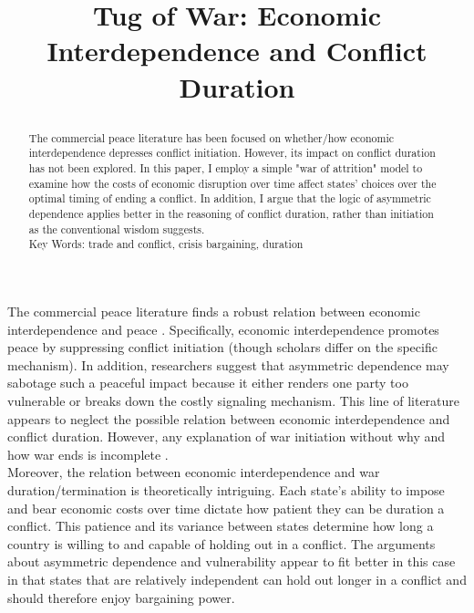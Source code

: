 \documentclass[12pt]{article} %
\title{    
 	\normalfont \normalsize 
 	\LARGE \textbf{Tug of War: Economic Interdependence and Conflict Duration}\\ %
 	\author{}
 }
\date{}
\begin{document}
 	
 	
 	\maketitle %
 	\thispagestyle{empty}
 	
 	
 	\newpage
 	
 	\begin{abstract}
 		The commercial peace literature has been focused on whether/how economic interdependence depresses conflict initiation. However, its impact on conflict duration has not been explored. In this paper, I employ a simple "war of attrition" model to examine how the costs of economic disruption over time affect states' choices over the optimal timing of ending a conflict. In addition, I argue that the logic of asymmetric dependence applies better in the reasoning of conflict duration, rather than initiation as the conventional wisdom suggests.\\
		 
		Key Words: trade and conflict, crisis bargaining, duration
 	\end{abstract}
 	\thispagestyle{empty}

 	
 	
 	\clearpage
 
 	
 	The commercial peace literature finds a robust relation between economic interdependence and peace \citep{OnealRusset1997,GartzkeLiBoehmer2001,PolachekXiang2010}. Specifically, economic interdependence promotes peace by suppressing conflict initiation (though scholars differ on the specific mechanism). In addition, researchers suggest that asymmetric dependence may sabotage such a peaceful impact because it either renders one party too vulnerable or breaks down the costly signaling mechanism. This line of literature appears to neglect the possible relation between economic interdependence and conflict duration. However, any explanation of war initiation without why and how war ends is incomplete \citep{Wagner2000,Ramsay2008}.\\
 	
 	Moreover, the relation between economic interdependence and war duration/termination is theoretically intriguing. 
 	Each state's ability to impose and bear economic costs over time dictate how patient they can be duration a conflict. This patience and its variance between states determine how long a country is willing to and capable of holding out in a conflict. The arguments about asymmetric dependence and vulnerability \citep{Hirschman1980,KeohaneNye1977,Wagner1988} appear to fit better in this case in that states that are relatively independent can hold out longer in a conflict and should therefore enjoy bargaining power.\\
 	
 	
 	
 	
 	
 	
 	\newpage
 	
 
\end{document}
